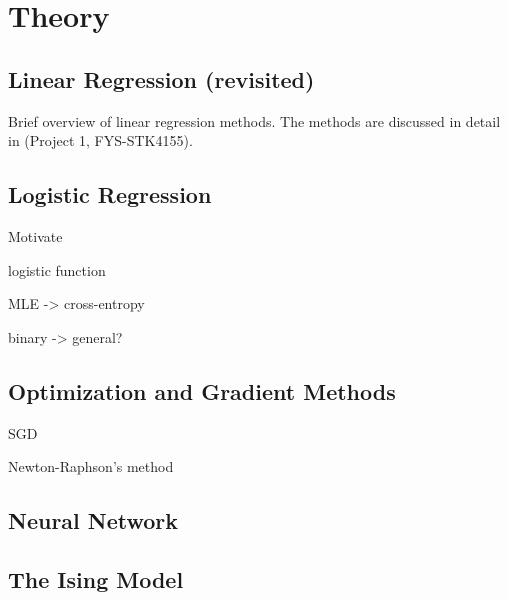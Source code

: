 \section{Theory}\label{sec:Theory}

\subsection{Linear Regression (revisited)}\label{sec:linreg theory}
Brief overview of linear regression methods. The methods are discussed in detail in (Project 1, FYS-STK4155).


\subsection{Logistic Regression}\label{sec:logreg theory}
Motivate

logistic function

MLE -> cross-entropy

binary -> general?




\subsection{Optimization and Gradient Methods}\label{sec:optim theory}
SGD

Newton-Raphson's method



\subsection{Neural Network}\label{sec:dnn theory}



\subsection{The Ising Model}\label{sec:ising theory}



